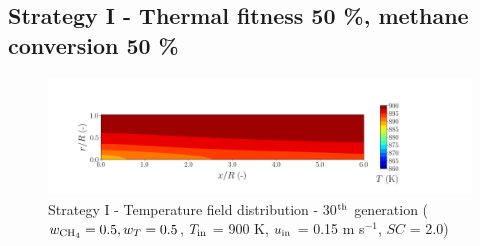 \documentclass[preprint,12pt]{elsarticle}
\begin{document}


\clearpage





\subsection{Strategy I - Thermal fitness 50 \%, methane conversion 50 \%}
\label{subsec:S15050}


%

\begin{figure}[h!]
\centering
\includegraphics[width=150mm]{results/5/50C_50T/GEN30-TFIELD.png}
\caption{\label{fig:5R5050G30-TField} Strategy I - Temperature field distribution - 30$^{\rm{th}}$ generation ($w_{\rm{CH_4}} = 0.5, w_T = 0.5$, $T_{\rm{in}}$ = 900 K, $u_{\rm{in}}$ = 0.15 m s$^{-1}$, $SC$ = 2.0)}
\end{figure}


%
\end{document}

